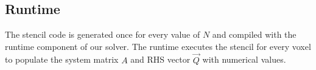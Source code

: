 




\subsection{Runtime}
\label{sec:solver_runtime}

The stencil code is generated once for every value of $N$ and compiled with the runtime component of our solver. The runtime executes the stencil for every voxel to populate the system matrix $A$ and RHS vector $\vec{Q}$ with numerical values.

